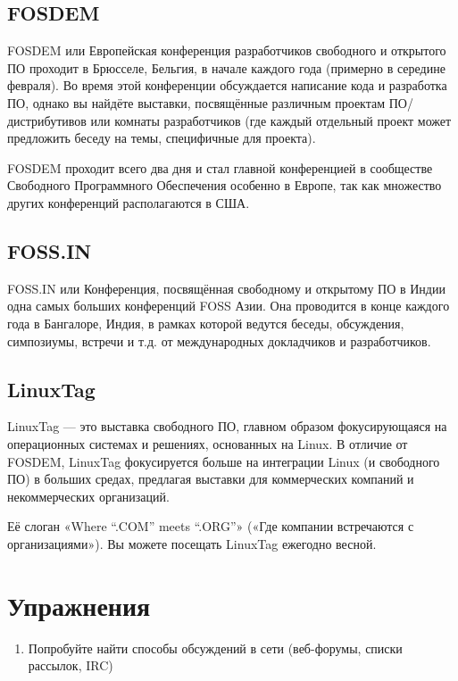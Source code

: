 \documentclass[10pt]{book}
\begin{document}
\subsection{FOSDEM}

FOSDEM или Европейская конференция разработчиков свободного и открытого ПО проходит в Брюсселе, Бельгия, в начале каждого года (примерно в середине февраля). Во время этой конференции обсуждается написание кода и разработка ПО, однако вы найдёте выставки, посвящённые различным проектам ПО/дистрибутивов или комнаты разработчиков (где каждый отдельный проект может предложить беседу на темы, специфичные для проекта).

FOSDEM проходит всего два дня и стал главной конференцией в сообществе Свободного Программного Обеспечения особенно в Европе, так как множество других конференций располагаются в США.

\subsection{FOSS.IN}

FOSS.IN или Конференция, посвящённая свободному и открытому ПО в Индии  одна самых больших конференций FOSS Азии. Она проводится в конце каждого года в Бангалоре, Индия, в рамках которой ведутся беседы, обсуждения, симпозиумы, встречи и т.д. от международных докладчиков и разработчиков.

\subsection{LinuxTag}

LinuxTag — это выставка свободного ПО, главном образом фокусирующаяся на операционных системах  и решениях, основанных на Linux. В отличие от FOSDEM, LinuxTag фокусируется больше на интеграции Linux (и свободного ПО) в больших средах, предлагая выставки для коммерческих компаний и некоммерческих организаций.

Её слоган «Where ``.COM'' meets ``.ORG''» («Где компании встречаются с организациями»). Вы можете посещать LinuxTag ежегодно весной.

\newpage
{\color{white}\section{Упражнения}}
\begin{tcolorbox}[title=\textbf{Упражнения}, colback=yellow!14!white, colframe=red!75!white]
\begin{enumerate}
	\item Попробуйте найти способы обсуждений в сети (веб-форумы, списки рассылок, IRC)
	\end{enumerate}
\end{tcolorbox}
\end{document}
